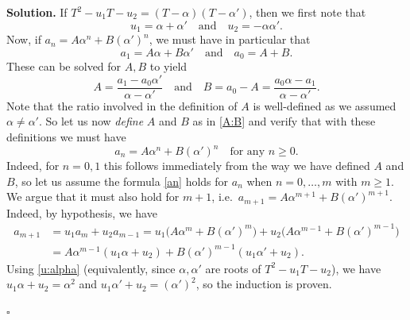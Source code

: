 \documentclass[12pt, reqno]{amsart}
\theoremstyle{definition}
\newenvironment{solution}
  {\par\smallskip\begin{tcolorbox}[breakable, enhanced, colback=solblue, colframe=solframe,
     boxrule=0.5pt, arc=2pt, left=6pt, right=6pt, top=4pt, bottom=4pt]\noindent\textbf{Solution.}}
  {\hfill$\square$\end{tcolorbox}\par\medskip}
\numberwithin{equation}{subsection}
\numberwithin{equation}{section}
\begin{document}
\begin{enumerate}
\begin{solution}
If $T^2-u_1T-u_2=(T-\alpha)(T-\alpha')$, then we first note that
\begin{equation}\label{u:alpha}
u_1=\alpha+\alpha'\quad\text{and}\quad u_2=-\alpha\alpha' .
\end{equation}
Now, if $a_n=A\alpha^n+B(\alpha')^n$, we must have in particular that
\begin{equation}\label{a12}
a_1=A\alpha+B\alpha'\quad\text{and}\quad a_0=A+B.
\end{equation}
These can be solved for $A,B$ to yield
\begin{equation}\label{A:B}
A=\frac{a_1-a_0\alpha'}{\alpha-\alpha'}\quad\text{and}\quad B=a_0-A=\frac{a_0\alpha-a_1}{\alpha-\alpha'} .
\end{equation}
Note that the ratio involved in the definition of $A$ is well-defined as we assumed $\alpha\neq\alpha'$. So let us now
\emph{define} $A$ and $B$ as in \eqref{A:B} and verify that with these definitions we must have
\begin{equation}\label{an}
a_n=A\alpha^n+B(\alpha')^n\quad\text{for any } n\geq0.
\end{equation}
Indeed, for $n=0,1$ this follows immediately from the way we have defined $A$ and $B$, so let us assume the formula
\eqref{an} holds for $a_n$ when $n=0,\dots,m$ with $m\geq1$. We argue that it must also hold for $m+1$, i.e.\
$a_{m+1}=A\alpha^{m+1}+B(\alpha')^{m+1}$. Indeed, by hypothesis, we have
\begin{align*}
a_{m+1}&=u_1a_m+u_2a_{m-1}=u_1\bigl(A\alpha^m+B(\alpha')^m\bigr)+u_2\bigl(A\alpha^{m-1}+B(\alpha')^{m-1}\bigr)\\
&=A\alpha^{m-1}(u_1\alpha+u_2)+B(\alpha')^{m-1}(u_1\alpha'+u_2).
\end{align*}
Using \eqref{u:alpha} (equivalently, since $\alpha,\alpha'$ are roots of $T^2-u_1T-u_2$), we have $u_1\alpha+u_2=\alpha^2$
and $u_1\alpha'+u_2=(\alpha')^2$, so the induction is proven.


\end{solution}
\end{enumerate}
\end{document}
